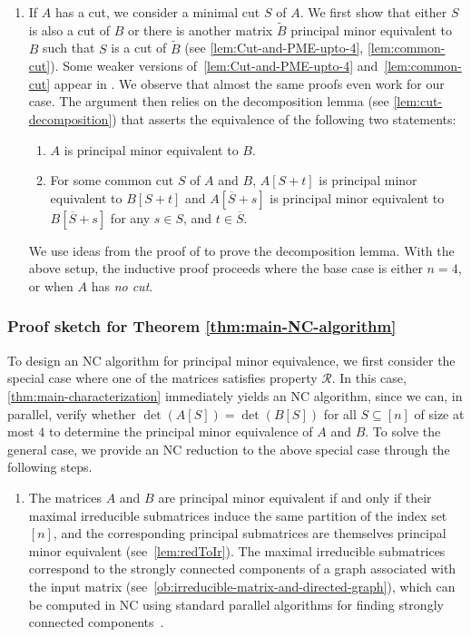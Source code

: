 \documentclass[11pt,letterpaper]{article}
\newcommand{\comp}[1]{\overline{#1}}
\newcommand{\prop}{\mathcal{R}}
\begin{document}
{{{\begin{enumerate}
     
	\item If $A$ has a cut, we consider a minimal cut $S$ of $A$. We first show that either $S$ is also a cut of $B$ or there is another matrix $\widetilde{B}$ principal minor equivalent to $B$ such that $S$ is a cut of $\widetilde{B}$ (see \cref{lem:Cut-and-PME-upto-4}, \cref{lem:common-cut}). Some weaker versions of~\cref{lem:Cut-and-PME-upto-4} and~\cref{lem:common-cut} appear in \cite[Lemma~3.5 and Lemma~3.6]{Chatterjee25}. We observe that almost the same proofs even work for our case. The argument then relies on the decomposition lemma (see \cref{lem:cut-decomposition}) that asserts the equivalence of the following two statements:
\begin{enumerate}
\item $A$ is principal minor equivalent to $B$.
\item For some common cut $S$ of $A$ and $B$,  $A[S+t]$ is principal minor equivalent to $B[S+t]$ and $A[\comp{S}+s]$ is principal minor equivalent to $B[\comp{S}+s]$ for any $s\in S$, and $t\in \comp{S}$.
\end{enumerate}
We use ideas from the proof of \cite[Lemma~2.12]{Chatterjee25} to prove the decomposition lemma. With the above setup, the inductive proof proceeds where the base case is either $n=4$, or when $A$ has \emph{no cut}.
\end{enumerate}

\subsubsection{Proof sketch for Theorem \ref{thm:main-NC-algorithm}} \label{sec:ideas thm NC}

To design an NC algorithm for principal minor equivalence, we first consider the special case where one of the matrices satisfies property $\prop$. In this case, \cref{thm:main-characterization} immediately yields an NC algorithm, since we can, in parallel, verify whether $\det(A[S])=\det(B[S])$ for all $S\subseteq [n]$ of size at most $4$ to determine the principal minor equivalence of $A$ and $B$. To solve the general case, we provide an NC reduction to the above special case through the following steps. 

\begin{enumerate}
     \item The matrices $A$ and $B$ are principal minor equivalent if and only if their maximal irreducible submatrices induce the same partition of the index set $[n]$, and the corresponding principal submatrices are themselves principal minor equivalent (see~\cref{lem:redToIr}). The maximal irreducible submatrices correspond to the strongly connected components of a graph associated with the input matrix (see~\cref{ob:irreducible-matrix-and-directed-graph}), which can be computed in NC using standard parallel algorithms for finding strongly connected components~\cite{Gazit88, Cole89}.


\end{enumerate}}}}
\end{document}
